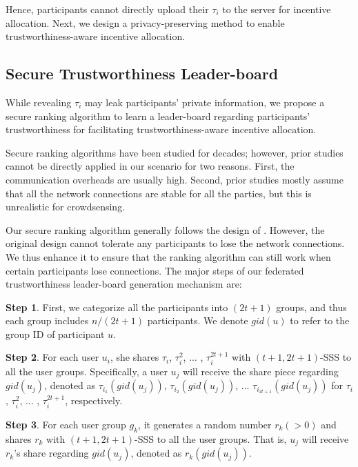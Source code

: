 \documentclass[11pt]{article}
\begin{document}
Hence, participants cannot directly upload their $\tau_i$ to the server for incentive allocation. Next, we design a privacy-preserving method to enable trustworthiness-aware incentive allocation.

\subsection{Secure Trustworthiness Leader-board}

While revealing $\tau_i$ may leak participants' private information, we propose a secure ranking algorithm to learn a  leader-board regarding participants' trustworthiness for facilitating trustworthiness-aware incentive allocation.

Secure ranking algorithms have been studied for decades; however, prior studies cannot be directly applied in our scenario for two reasons. First, the communication overheads are usually high. Second, prior studies mostly assume that all the network connections are stable for all the parties, but this is unrealistic for crowdsensing.

Our secure ranking algorithm generally follows the design of \cite{Leye-tang2011secure}. However, the original design \cite{Leye-tang2011secure} cannot tolerate any participants to lose the network connections. We thus enhance it to ensure that the ranking algorithm can still work when certain participants lose connections.
The major steps of our federated trustworthiness leader-board generation mechanism are:

\textbf{Step 1}. First, we categorize all the participants into $(2t+1)$ groups, and thus each group includes $n/(2t+1)$ participants. We denote $gid(u)$ to refer to the group ID of participant $u$.

\textbf{Step 2}. For each user $u_i$, she shares $\tau_i$, $\tau_i^2$, ... , $\tau_i^{2t+1}$ with $(t+1, 2t+1)$-SSS to all the user groups. Specifically, a user $u_j$ will receive the share piece regarding $gid(u_j)$, denoted as $\tau_{i_1}(gid(u_j))$, $\tau_{i_2}(gid(u_j))$, ... $\tau_{i_{2t+1}}(gid(u_j))$ for $\tau_i$, $\tau_i^2$, ... , $\tau_i^{2t+1}$, respectively.

\textbf{Step 3}. For each user group $g_k$, it generates a random number $r_k (>0)$ and shares $r_k$ with $(t+1, 2t+1)$-SSS to all the user groups. That is, $u_j$ will receive $r_k$'s share regarding $gid(u_j)$, denoted as $r_k(gid(u_j))$.
\end{document}
